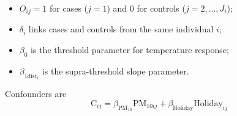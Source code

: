 \documentclass[slidestop,compress,serif,10pt]{beamer}
\begin{document}
\begin{frame}
\begin{itemize}
\item $O_{ij}= 1$ for cases ($j=1$) and 0 for controls ($j=2,\ldots,J_i$);
\item $\delta_i$ links cases and controls from the same individual $i$;
\item $\beta_{0}$ is the threshold parameter for temperature response;
\item $\beta_{1\text{dist}_i}$  is the supra-threshold slope parameter.
\end{itemize}

\vspace{10pt} Confounders are
\[\text{C}_{ij} = \beta_{\text{PM}_{10}}\text{PM}_{10ij}  + \beta_{\text{Holiday}}\text{Holiday}_{ij}\]
\end{frame}
\end{document}
